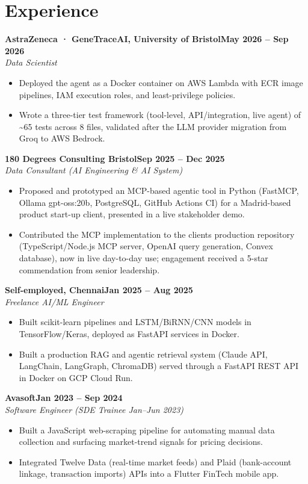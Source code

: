 \documentclass[a4paper,10pt]{article}
\newcommand{\entry}[4]{\noindent\textbf{#1}\hfill\textbf{#2}\\ \textit{#3}\hfill\textit{#4}\par}
\begin{document}
\section{Experience}
\entry{AstraZeneca · GeneTraceAI, University of Bristol}{May 2026 – Sep 2026}{Data Scientist}{}
\begin{itemize}
  \item Deployed the agent as a Docker container on AWS Lambda with ECR image pipelines, IAM execution roles, and least-privilege policies.
  \item Wrote a three-tier test framework (tool-level, API/integration, live agent) of \textasciitilde{}65 tests across 8 files, validated after the LLM provider migration from Groq to AWS Bedrock.
\end{itemize}
\vspace{3pt}
\entry{180 Degrees Consulting Bristol}{Sep 2025 – Dec 2025}{Data Consultant (AI Engineering \& AI System)}{}
\begin{itemize}
  \item Proposed and prototyped an MCP-based agentic tool in Python (FastMCP, Ollama gpt-oss:20b, PostgreSQL, GitHub Actions CI) for a Madrid-based product start-up client, presented in a live stakeholder demo.
  \item Contributed the MCP implementation to the client\textquotesingle{}s production repository (TypeScript/Node.js MCP server, OpenAI query generation, Convex database), now in live day-to-day use; engagement received a 5-star commendation from senior leadership.
\end{itemize}
\vspace{3pt}
\entry{Self-employed, Chennai}{Jan 2025 – Aug 2025}{Freelance AI/ML Engineer}{}
\begin{itemize}
  \item Built scikit-learn pipelines and LSTM/BiRNN/CNN models in TensorFlow/Keras, deployed as FastAPI services in Docker.
  \item Built a production RAG and agentic retrieval system (Claude API, LangChain, LangGraph, ChromaDB) served through a FastAPI REST API in Docker on GCP Cloud Run.
\end{itemize}
\vspace{3pt}
\entry{Avasoft}{Jan 2023 – Sep 2024}{Software Engineer (SDE Trainee Jan–Jun 2023)}{}
\begin{itemize}
  \item Built a JavaScript web-scraping pipeline for automating manual data collection and surfacing market-trend signals for pricing decisions.
  \item Integrated Twelve Data (real-time market feeds) and Plaid (bank-account linkage, transaction imports) APIs into a Flutter FinTech mobile app.
\end{itemize}
\end{document}
